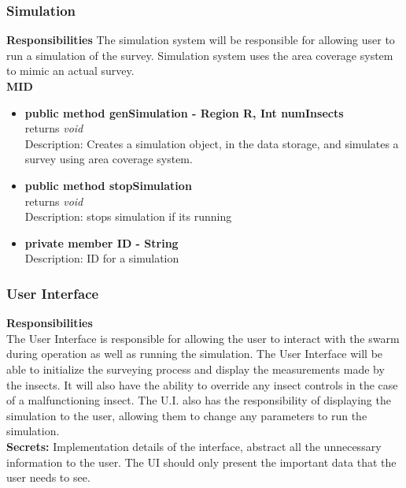 \documentclass[11pt]{article}
\begin{document}
\subsubsection{Simulation}
\textbf{Responsibilities}
The simulation system will be responsible for allowing user to run a simulation of the survey. Simulation system uses the area coverage system to mimic an actual survey. \\
\textbf{MID}
\begin{itemize}
    \item \textbf{public method genSimulation - Region R, Int numInsects } \\ 
    returns \textit{void} \\
    Description: Creates a simulation object, in the data storage, and simulates a survey using area coverage system.
    \item \textbf{public method stopSimulation} \\
    returns \textit{void} \\
    Description: stops simulation if its running
    \item \textbf{private member ID - String} \\
    Description: ID for a simulation
\end{itemize}
\subsubsection{User Interface}
\textbf{Responsibilities}\\
The User Interface is responsible for allowing the user to interact with the swarm during operation as well as running the simulation. The User Interface will be able to initialize the surveying process and display the measurements made by the insects. It will also have the ability to override any insect controls in the case of a malfunctioning insect. The U.I. also has the responsibility of displaying the simulation to the user, allowing them to change any parameters to run the simulation.\\
\newline
\textbf{Secrets: }Implementation details of the interface, abstract all the unnecessary information to the user. The UI should only present the important data that the user needs to see. \\
\end{document}
